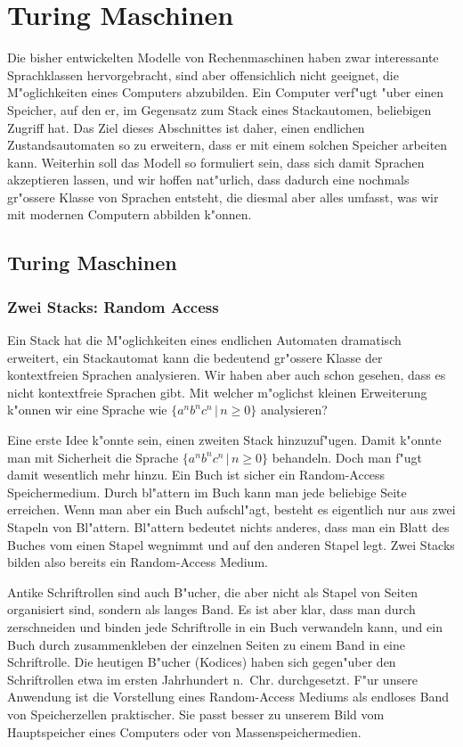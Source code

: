 %
%
%
\def\blank{\text{\textvisiblespace}}
\chapter{Turing Maschinen\label{chapter-turing}}
Die bisher entwickelten Modelle von Rechenmaschinen haben zwar
interessante Sprachklassen hervorgebracht, sind aber offensichlich nicht
geeignet, die M"oglichkeiten eines Computers abzubilden. Ein
Computer verf"ugt "uber einen Speicher, auf den er, im Gegensatz zum
Stack eines Stackautomen, beliebigen Zugriff hat. Das Ziel dieses
Abschnittes ist daher, einen endlichen Zustandsautomaten so zu
erweitern, dass er mit einem solchen Speicher arbeiten kann.
Weiterhin soll das Modell so formuliert sein, dass sich damit
Sprachen akzeptieren lassen, und wir hoffen nat"urlich, dass dadurch
eine nochmals gr"ossere Klasse von Sprachen entsteht, die diesmal
aber alles umfasst, was wir mit modernen Computern abbilden k"onnen.

\section{Turing Maschinen}
\subsection{Zwei Stacks: Random Access}
Ein Stack hat die M"oglichkeiten eines endlichen Automaten dramatisch
erweitert, ein Stackautomat kann die bedeutend gr"ossere Klasse der
kontextfreien Sprachen analysieren. Wir haben aber auch schon gesehen,
dass es nicht kontextfreie Sprachen gibt. Mit welcher m"oglichst kleinen
Erweiterung k"onnen wir eine Sprache wie $\{a^nb^nc^n\,|\, n\ge 0\}$
analysieren?

Eine erste Idee k"onnte sein, einen zweiten Stack hinzuzuf"ugen.
Damit k"onnte man mit Sicherheit die Sprache $\{a^nb^nc^n\,|\,n\ge 0\}$
behandeln. Doch man f"ugt damit wesentlich mehr hinzu. Ein Buch ist
sicher ein Random-Access Speichermedium. Durch bl"attern im Buch
kann man jede beliebige Seite erreichen. Wenn man aber ein Buch
aufschl"agt, besteht es eigentlich nur aus zwei Stapeln von Bl"attern.
Bl"attern bedeutet nichts anderes, dass man ein Blatt des Buches vom
einen Stapel wegnimmt und auf den anderen Stapel legt. Zwei Stacks
bilden also bereits ein Random-Access Medium.

Antike Schriftrollen sind auch B"ucher, die aber nicht als Stapel
von Seiten organisiert sind, sondern als langes Band. Es ist aber klar,
dass man durch zerschneiden und binden jede Schriftrolle in ein
Buch verwandeln kann, und ein Buch durch zusammenkleben der einzelnen
Seiten zu einem Band in eine Schriftrolle.
Die heutigen B"ucher (Kodices) haben sich gegen"uber den Schriftrollen
etwa im ersten Jahrhundert n.~Chr. durchgesetzt.
F"ur unsere Anwendung ist die Vorstellung eines Random-Access Mediums
als endloses Band von Speicherzellen praktischer. Sie passt besser zu
unserem Bild vom Hauptspeicher eines Computers oder von Massenspeichermedien.
